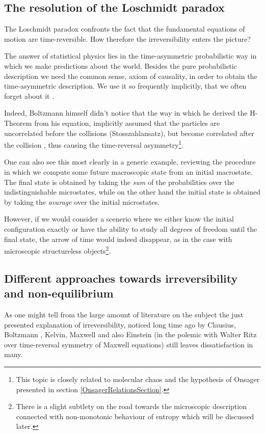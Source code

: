 \documentclass[a4paper,12pt]{article}
\begin{document}
\subsection{The resolution of the Loschmidt paradox }

The Loschmidt paradox confronts the fact that the fundamental equations of motion are time-reversible. How therefore the irreversibility enters the picture?

The answer of statistical physics lies in the time-asymmetric probabilistic way in which we make predictions about the world. 
Besides the pure probabilistic description we need the common sense, axiom of causality, in order to obtain the time-asymmetric description.
We use it so frequently implicitly, that we often forget about it \cite{Evans:2241458}. 

Indeed, Boltzmann himself didn't notice that the way in which he derived the H-Theorem from his equation, implicitly assumed that the particles are uncorrelated before the collisions (Stosszahlansatz), but become correlated after the collision \cite{Schwabl:2002, Dorfman:ozm67-zD}, thus causing the time-reversal asymmetry\footnote{This topic is closely related to molecular chaos and the hypothesis of Onsager presented in section \ref{OnsagerRelationsSection}.}.

One can also see this most clearly in a generic example, reviewing the procedure in which we compute some future macroscopic state from an initial macrostate. The final state is obtained by taking the \textit{sum} of the probabilities over the indistinguishable microstates, while on the other hand the initial state is obtained by taking the \textit{avarage} over the initial microstates.

However, if we would consider a scenerio where we either know the initial configuration exactly or have the ability to study all degrees of freedom until the final state, the arrow of time would indeed disappear, as in the case with microscopic structureless objects\footnote{There is a slight subtlety on the road towards the microscopic description connected with non-monotonic behaviour of entropy which will be discussed later.}.

\subsection{Different approaches towards irreversibility and non-equilibrium}

As one might tell from the large amount of literature on the subject \cite{Doyle:wf, Layzer:1970dx, Wolfram:552851, Rovelli:2015tv, Courbage:1983eo} %
the just presented explanation of irreversibility, noticed long time ago by Clausius, Boltzmann \cite{Wolfram:552851}, Kelvin, Maxwell \cite{Anonymous:0uVSJOI5} and also Einstein (in the polemic with Walter Ritz over time-reversal symmetry of Maxwell equations) still leaves dissatisfaction in many.
\end{document}
